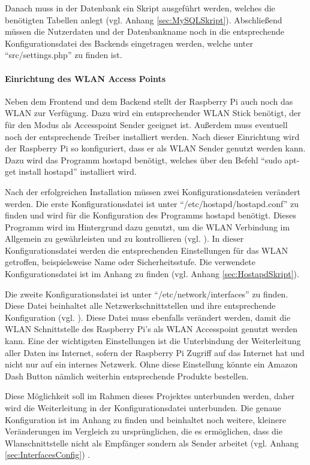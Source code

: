 Danach muss in der Datenbank ein Skript ausgeführt werden, welches die benötigten Tabellen anlegt (vgl. Anhang \ref{sec:MySQLSkript}). Abschließend müssen die Nutzerdaten und der Datenbankname noch in die entsprechende Konfigurationsdatei des Backends eingetragen werden, welche unter ``src/settings.php'' zu finden ist. 

\paragraph{Einrichtung des \ac{WLAN} Access Points}$\;$ \\ 
\label{sec:Einrichtung des WLAN Access Points-1} 
Neben dem Frontend und dem Backend stellt der Raspberry Pi auch noch das \ac{WLAN} zur Verfügung. Dazu wird ein entsprechender \ac{WLAN} Stick benötigt, der für den Modus als Accesspoint Sender geeignet ist. Außerdem muss eventuell noch der entsprechende Treiber installiert werden. Nach dieser Einrichtung wird der Raspberry Pi so konfiguriert, dass er als \ac{WLAN} Sender genutzt werden kann. Dazu wird das Programm hostapd benötigt, welches über den Befehl ``sudo apt-get install hostapd'' installiert wird. 

Nach der erfolgreichen Installation müssen zwei Konfigurationsdateien verändert werden. Die erste Konfigurationsdatei ist unter ``/etc/hostapd/hostapd.conf'' zu finden und wird für die Konfiguration des Programms hostapd benötigt. Dieses Programm wird im Hintergrund dazu genutzt, um die \ac{WLAN} Verbindung im Allgemein zu gewährleisten und zu kontrollieren (vgl. \cite{.o}\cite{.n}). In dieser Konfigurationsdatei werden die entsprechenden Einstellungen für das \ac{WLAN} getroffen, beispielsweise Name oder Sicherheitsstufe. Die verwendete Konfigurationsdatei ist im Anhang zu finden (vgl. Anhang \ref{sec:HostapdSkript}).

Die zweite Konfigurationsdatei ist unter ``/etc/network/interfaces'' zu finden. Diese Datei beinhaltet alle Netzwerkschnittstellen und ihre entsprechende Konfiguration (vgl. \cite{.p}). Diese Datei muss ebenfalls verändert werden, damit die \ac{WLAN} Schnittstelle des Raspberry Pi's als \ac{WLAN} Accesspoint genutzt werden kann. Eine der wichtigsten Einstellungen ist die Unterbindung der Weiterleitung aller Daten ins Internet, sofern der Raspberry Pi Zugriff auf das Internet hat und nicht nur auf ein internes Netzwerk. Ohne diese Einstellung könnte ein Amazon Dash Button nämlich weiterhin entsprechende Produkte bestellen. 

Diese Möglichkeit soll im Rahmen dieses Projektes unterbunden werden, daher wird die Weiterleitung in der Konfigurationsdatei unterbunden. Die genaue Konfiguration ist im Anhang zu finden und beinhaltet noch weitere, kleinere Veränderungen im Vergleich zu ursprünglichen, die es ermöglichen, dass die Wlanschnittstelle nicht als Empfänger sondern als Sender arbeitet (vgl. Anhang \ref{sec:InterfacesConfig}) .

